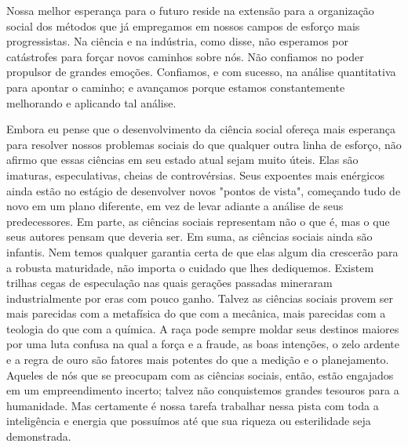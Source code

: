 \documentclass[12pt]{article}
\begin{document}
Nossa melhor esperança para o futuro reside na extensão para a organização social dos métodos que já empregamos em nossos campos de esforço mais progressistas. Na ciência e na indústria, como disse, não esperamos por catástrofes para forçar novos caminhos sobre nós. Não confiamos no poder propulsor de grandes emoções. Confiamos, e com sucesso, na análise quantitativa para apontar o caminho; e avançamos porque estamos constantemente melhorando e aplicando tal análise.

Embora eu pense que o desenvolvimento da ciência social ofereça mais esperança para resolver nossos problemas sociais do que qualquer outra linha de esforço, não afirmo que essas ciências em seu estado atual sejam muito úteis. Elas são imaturas, especulativas, cheias de controvérsias. Seus expoentes mais enérgicos ainda estão no estágio de desenvolver novos "pontos de vista", começando tudo de novo em um plano diferente, em vez de levar adiante a análise de seus predecessores. Em parte, as ciências sociais representam não o que é, mas o que seus autores pensam que deveria ser. Em suma, as ciências sociais ainda são infantis. Nem temos qualquer garantia certa de que elas algum dia crescerão para a robusta maturidade, não importa o cuidado que lhes dediquemos. Existem trilhas cegas de especulação nas quais gerações passadas mineraram industrialmente por eras com pouco ganho. Talvez as ciências sociais provem ser mais parecidas com a metafísica do que com a mecânica, mais parecidas com a teologia do que com a química. A raça pode sempre moldar seus destinos maiores por uma luta confusa na qual a força e a fraude, as boas intenções, o zelo ardente e a regra de ouro são fatores mais potentes do que a medição e o planejamento. Aqueles de nós que se preocupam com as ciências sociais, então, estão engajados em um empreendimento incerto; talvez não conquistemos grandes tesouros para a humanidade. Mas certamente é nossa tarefa trabalhar nessa pista com toda a inteligência e energia que possuímos até que sua riqueza ou esterilidade seja demonstrada.
\end{document}
